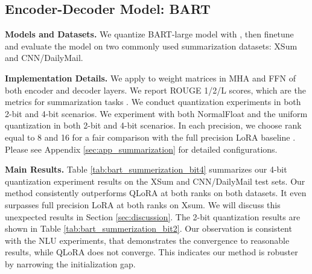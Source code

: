 



\subsection{Encoder-Decoder Model: BART}
\textbf{Models and Datasets.} We quantize BART-large model \citep{lewis-etal-2020-bart}  with {\OurAlg}, then finetune and evaluate the model on two commonly used summarization datasets: XSum \citep{Narayan2018xsum} and CNN/DailyMail\citep{hermann2015teaching}.

\noindent \textbf{Implementation Details.} We apply {\OurAlg} to weight matrices in MHA and FFN of both encoder and decoder layers. We report ROUGE 1/2/L scores, which are the metrics for summarization tasks \citep{lin-2004-rouge}. We conduct quantization experiments in both 2-bit and 4-bit scenarios. We experiment with both NormalFloat and the uniform quantization in both 2-bit and 4-bit scenarios. In each precision, we choose rank equal to 8 and 16 for a fair comparison with the full precision LoRA baseline \citep{zhang2023adaptive}. Please see Appendix \ref{sec:app_summarization} for detailed configurations.

\noindent \textbf{Main Results.} Table \ref{tab:bart_summerization_bit4} summarizes our 4-bit quantization experiment results on the XSum and CNN/DailyMail test sets. Our method consistently outperforms QLoRA at both ranks on both datasets. It even surpasses full precision LoRA at both ranks on Xsum. We will discuss this unexpected results in Section \ref{sec:discussion}. The 2-bit quantization results are shown in Table \ref{tab:bart_summerization_bit2}. Our observation is consistent with the NLU experiments, that {\OurAlg} demonstrates the convergence to reasonable results, while QLoRA does not converge. This indicates our method is robuster by narrowing the initialization gap. 

